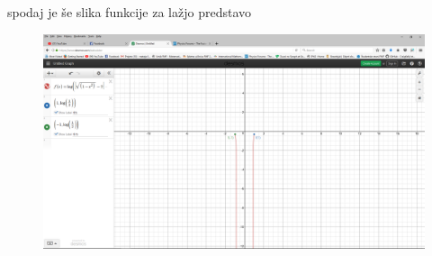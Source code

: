 \documentclass[a4paper]{article}
\begin{document}
\begin{itemize}
spodaj je še slika funkcije za lažjo predstavo
\begin{figure}
\includegraphics[width=\textwidth]{Funkcija.png}
\end{figure}
\end{itemize}
\end{document}
